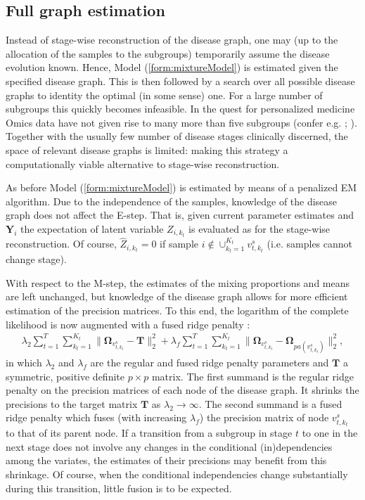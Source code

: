 \documentclass[10pt]{article}
\begin{document}
\subsection{Full graph estimation}\label{sec:fullgraph}
Instead of stage-wise reconstruction of the disease graph, one may (up to the allocation of the samples to the subgroups) temporarily assume the disease evolution known. Hence, Model (\ref{form:mixtureModel}) is estimated given the specified disease graph. This is then followed by a search over all possible disease graphs to identity the optimal (in some sense) one. For a large number of subgroups this quickly becomes infeasible. In the quest for personalized medicine Omics data have not given rise to many more than five subgroups (confer e.g. \citealp{Per2000}; \citealp{Sorl2001}). Together with the usually few number of disease stages clinically discerned, the space of relevant disease graphs is limited: making this strategy a computationally viable alternative to stage-wise reconstruction.

As before Model (\ref{form:mixtureModel}) is estimated by means of a penalized EM algorithm. Due to the independence of the samples, knowledge of the disease graph does not affect the E-step. That is, given current parameter estimates and $\mathbf{Y}_i$ the expectation of latent variable $Z_{i, k_t}$ is evaluated as for the stage-wise reconstruction. Of course, $\hat{Z}_{i, k_t} = 0$ if sample $i \not\in \cup_{k_t=1}^{K_t} v_{t, k_t}^s$ (i.e. samples cannot change stage).

With respect to the M-step, the estimates of the mixing proportions and means are left unchanged, but knowledge of the disease graph allows for more efficient estimation of the precision matrices. To this end, the logarithm of the complete likelihood is now augmented with a fused ridge penalty \citep{Bilg2015}:
\begin{eqnarray*}
\lambda_2 \sum_{t=1}^T\sum_{k_t=1}^{K_t} \| \mathbf{\Omega}_{v^s_{t, k_t}} - \mathbf{T} \|_2^2  + \lambda_f \sum_{t=1}^T \sum_{k_t=1}^{K_t} \| \mathbf{\Omega}_{v^s_{t, k_t}} - \mathbf{\Omega}_{pa(v^s_{t, k_t})} \|_2^2,
\end{eqnarray*}
in which $\lambda_2$ and $\lambda_f$ are the regular and fused ridge penalty parameters and $\mathbf{T}$ a symmetric, positive definite $p \times p$ matrix. The first summand is the regular ridge penalty on the precision matrices of each node of the disease graph. It shrinks the precisions to the target matrix $\mathbf{T}$ as $\lambda_2 \rightarrow \infty$. The second summand is a fused ridge penalty which fuses (with increasing $\lambda_f$) the precision matrix of node $v^s_{t, k_t}$ to that of its parent node. If a transition from a subgroup in stage $t$ to one in the next stage does not involve any changes in the conditional (in)dependencies among the variates, the estimates of their precisions may benefit from this shrinkage. Of course, when the conditional independencies change substantially during this transition, little fusion is to be expected.
\end{document}
